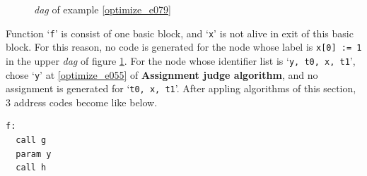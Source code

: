 \begin{Example}
\begin{figure}[htbp]
\begin{center}
\begin{latexonly}
\end{latexonly}
\caption{{\em dag} of example \ref{optimize_e079}}
\label{optimize_e080}
\end{center}
\end{figure}
Function `{\tt{f}}' is consist of one basic block, and 
`{\tt{x}}' is not alive in exit of this basic block.
For this reason, no code is generated
for the node whose label is {\tt{x[0] :=
 1}} in the upper {\em dag} of figure \ref{optimize_e080}.
For the node whose identifier list is `{\tt{y, t0, x, t1}}',
chose `{\tt{y}}' at \ref{optimize_e055} of {\bf Assignment judge
algorithm}, and no assignment is generated for `{\tt{t0, x, t1}}'.
After appling algorithms of this section,
3 address codes become like below.
\begin{verbatim}
f:
  call g
  param y
  call h
\end{verbatim}
\end{Example}

